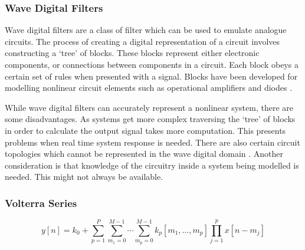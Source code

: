 		\subsubsection{Wave Digital Filters}
			Wave digital filters are a class of filter which can be used to emulate analogue circuits. The
			process of creating a digital representation of a circuit involves constructing a `tree' of blocks.
			These blocks represent either electronic components, or connections between components in a
			circuit. Each block obeys a certain set of rules when presented with a signal. Blocks have been
			developed for modelling nonlinear circuit elements such as operational amplifiers and diodes
			\citep{paiva2012emulation}.

			While wave digital filters can accurately represent a nonlinear system, there are some
			disadvantages. As systems get more complex traversing the `tree' of blocks in order to calculate
			the output signal takes more computation. This presents problems when real time system response is
			needed. There are also certain circuit topologies which cannot be represented in the wave digital
			domain \citep{valimaki2011virtual}. Another consideration is that knowledge of the circuitry inside
			a system being modelled is needed. This might not always be available.

		\subsubsection{Volterra Series}
			\begin{equation}
				y[n] = k_{0} + \sum_{p = 1}^{P} 
					\sum_{m_{1} = 0}^{M - 1} \dotsi \sum_{m_{p} = 0}^{M - 1}
					k_{p}[m_{1}, \dotsc , m_{p}]
					\prod_{j = 1}^{p} x[n - m_{j}]
				\label{eq:VolterraSeries}
			\end{equation}

